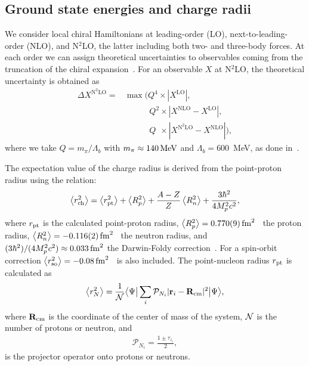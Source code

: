 \documentclass[aps,prc,twocolumn,superscriptaddress,floatfix]{revtex4-1}
\begin{document}
\subsection{Ground state energies and charge radii}
We consider local chiral Hamiltonians at leading-order (LO), 
next-to-leading-order (NLO), and N$^2$LO, the latter including both two- and three-body forces.
At each order we can assign theoretical uncertainties to observables coming from the 
truncation of the chiral expansion~\cite{Epelbaum:2015epja}. For an observable $X$ at N$^2$LO, 
the theoretical uncertainty is obtained as
\begin{align}
\Delta X^{\text{N}^2\text{LO}}=&\max(Q^4\times|X^{\text{LO}}|,\nonumber \\ 
&\phantom{\max(\,}Q^2\times|X^{\text{NLO}}-X^{\text{LO}}|, \nonumber \\
&\phantom{\max(\,}Q^{\phantom{2}}\times|X^{\text{N}^2\text{LO}}-X^{\text{NLO}}|),
\label{eq:err}
\end{align}
where we take $Q=m_\pi/\Lambda_b$ with $m_\pi\approx140\,\rm MeV$ and $\Lambda_b=600$~MeV, 
as done in~\cite{Lynn:2016,Lonardoni:2017afdmc}.

The expectation value of the charge radius is derived from the point-proton radius using the relation:
\begin{align}
	\left\langle r_{\rm ch}^2\right\rangle=
	\left\langle r_{\rm pt}^2\right\rangle+
	\left\langle R_p^2\right\rangle+
	\frac{A-Z}{Z}\left\langle R_n^2\right\rangle+
	\frac{3\hbar^2}{4M_p^2c^2},
	\label{eq:rch}
\end{align}
where $r_{\rm pt}$ is the calculated point-proton radius,
$\left\langle R_p^2\right\rangle=0.770(9)\,\rm{fm}^2$~\cite{Beringer:2012} the proton radius, 
$\left\langle R_n^2\right\rangle=-0.116(2)\,\rm{fm}^2$~\cite{Beringer:2012} the neutron radius,
and $(3\hbar^2)/(4M_p^2c^2)\approx0.033\,\rm{fm}^2$ the Darwin-Foldy correction~\cite{Friar:1997}.
For  a spin-orbit correction 
$\left\langle r_{\rm so}^2\right\rangle=-0.08\,\rm{fm}^2$~\cite{Ong:2010} is also included.
The point-nucleon radius $r_{\rm pt}$ is calculated as
\begin{align}
	\left\langle r_N^2\right\rangle=\frac{1}{{\cal N}}\big\langle\Psi\big|\sum_i\mathcal P_{N_i} |\vb{r}_i-\vb{R}_{\rm cm}|^2\big|\Psi\big\rangle,
\end{align}
where $\vb{R}_{\rm cm}$ is the coordinate of the center of mass of the system,
${\cal N}$ is the number of protons or neutron, and 
\begin{align}
	\mathcal P_{N_i}=\frac{1\pm\tau_{z_i}}{2},
	\label{eq:proj}
\end{align}
is the projector operator onto protons or neutrons.
\end{document}
